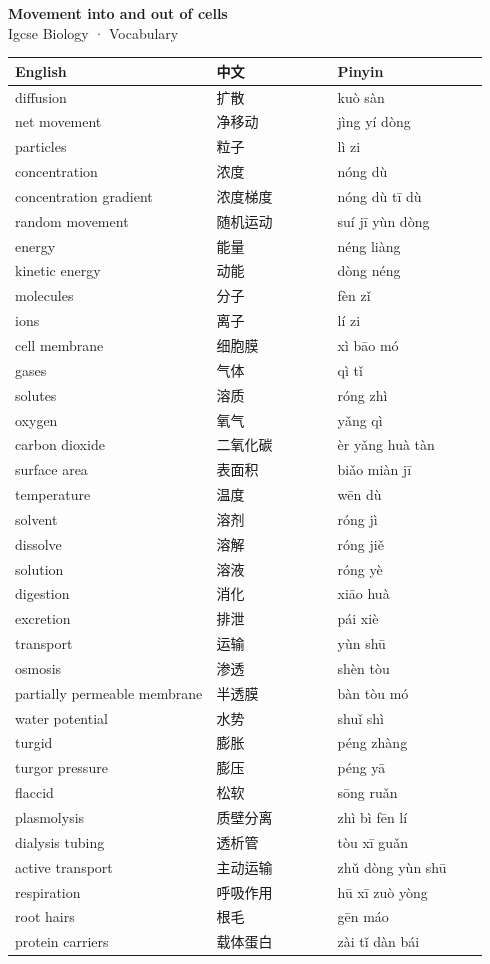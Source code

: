 \documentclass[11pt]{article}
\begin{document}
\begin{center}
  {\LARGE\bfseries Movement into and out of cells}\\[0.35em]
  {\large Igcse Biology · Vocabulary}
\end{center}
\vspace{0.6em}

\begin{longtable}{@{}p{0.40\linewidth}p{0.24\linewidth}p{0.30\linewidth}@{}}
\toprule
\textbf{English} & \textbf{中文} & \textbf{Pinyin} \\
\midrule
\endhead
\bottomrule
\endlastfoot
diffusion & 扩散 & kuò sàn \\
net movement & 净移动 & jìng yí dòng \\
particles & 粒子 & lì zi \\
concentration & 浓度 & nóng dù \\
concentration gradient & 浓度梯度 & nóng dù tī dù \\
random movement & 随机运动 & suí jī yùn dòng \\
energy & 能量 & néng liàng \\
kinetic energy & 动能 & dòng néng \\
molecules & 分子 & fèn zǐ \\
ions & 离子 & lí zi \\
cell membrane & 细胞膜 & xì bāo mó \\
gases & 气体 & qì tǐ \\
solutes & 溶质 & róng zhì \\
oxygen & 氧气 & yǎng qì \\
carbon dioxide & 二氧化碳 & èr yǎng huà tàn \\
surface area & 表面积 & biǎo miàn jī \\
temperature & 温度 & wēn dù \\
solvent & 溶剂 & róng jì \\
dissolve & 溶解 & róng jiě \\
solution & 溶液 & róng yè \\
digestion & 消化 & xiāo huà \\
excretion & 排泄 & pái xiè \\
transport & 运输 & yùn shū \\
osmosis & 渗透 & shèn tòu \\
partially permeable membrane & 半透膜 & bàn tòu mó \\
water potential & 水势 & shuǐ shì \\
turgid & 膨胀 & péng zhàng \\
turgor pressure & 膨压 & péng yā \\
flaccid & 松软 & sōng ruǎn \\
plasmolysis & 质壁分离 & zhì bì fēn lí \\
dialysis tubing & 透析管 & tòu xī guǎn \\
active transport & 主动运输 & zhǔ dòng yùn shū \\
respiration & 呼吸作用 & hū xī zuò yòng \\
root hairs & 根毛 & gēn máo \\
protein carriers & 载体蛋白 & zài tǐ dàn bái \\
\end{longtable}
\end{document}
